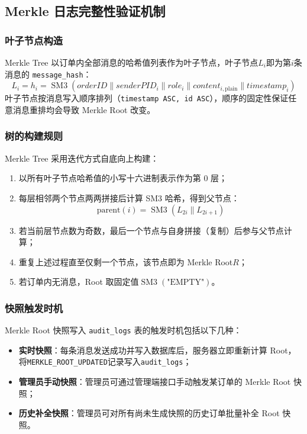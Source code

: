 \subsection{Merkle 日志完整性验证机制}
\label{subsec:merkle}

\subsubsection*{叶子节点构造}

Merkle Tree 以订单内全部消息的哈希值列表作为叶子节点，叶子节点$L_i$即为第$i$条消息的 \texttt{message\_hash}：
\[
  L_i = h_i = \operatorname{SM3}(\mathit{orderID} \| \mathit{senderPID}_i \| \mathit{role}_i \| \mathit{content}_{i,\mathrm{plain}} \| \mathit{timestamp}_i)
\]
叶子节点按消息写入顺序排列（\texttt{timestamp ASC, id ASC}），顺序的固定性保证任意消息重排均会导致 Merkle Root 改变。

\subsubsection*{树的构建规则}

Merkle Tree 采用迭代方式自底向上构建：

\begin{enumerate}[label=\arabic*., leftmargin=2em]
  \item 以所有叶子节点哈希值的小写十六进制表示作为第 0 层；
  \item 每层相邻两个节点两两拼接后计算 SM3 哈希，得到父节点：
    \[
      \mathrm{parent}(i) = \operatorname{SM3}(L_{2i} \| L_{2i+1})
    \]
  \item 若当前层节点数为奇数，最后一个节点与自身拼接（复制）后参与父节点计算；
  \item 重复上述过程直至仅剩一个节点，该节点即为 Merkle Root$R$；
  \item 若订单内无消息，Root 取固定值$\operatorname{SM3}(\text{"EMPTY"})$。
\end{enumerate}

\subsubsection*{快照触发时机}

Merkle Root 快照写入 \texttt{audit\_logs} 表的触发时机包括以下几种：

\begin{itemize}[leftmargin=2em]
  \item \textbf{实时快照}：每条消息发送成功并写入数据库后，服务器立即重新计算 Root，将\texttt{MERKLE\_ROOT\_UPDATED}记录写入\texttt{audit\_logs}；
  \item \textbf{管理员手动快照}：管理员可通过管理端接口手动触发某订单的 Merkle Root 快照；
  \item \textbf{历史补全快照}：管理员可对所有尚未生成快照的历史订单批量补全 Root 快照。
\end{itemize}

